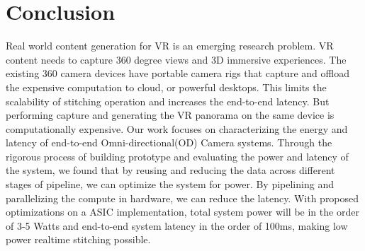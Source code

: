 \chapter{Conclusion}
Real world content generation for VR is an emerging research problem. VR content needs to capture 360 degree views and 3D immersive experiences. The existing 360 camera devices have portable camera rigs that capture and offload the expensive computation to cloud, or powerful desktops. This limits the scalability of stitching operation  and increases the end-to-end latency. But performing capture and generating the VR panorama on the same device is computationally expensive. 	Our work focuses on characterizing the energy and latency of end-to-end Omni-directional(OD) Camera  systems. Through the rigorous process of building prototype and evaluating the power and latency of the system, we found that by reusing and reducing the data across different stages of pipeline, we can optimize the system for power. By pipelining and parallelizing the compute in hardware, we can reduce the latency. With proposed optimizations on a ASIC implementation, total system power will be in the order of 3-5 Watts and end-to-end system latency in the order of 100ms, making low power realtime stitching possible.



